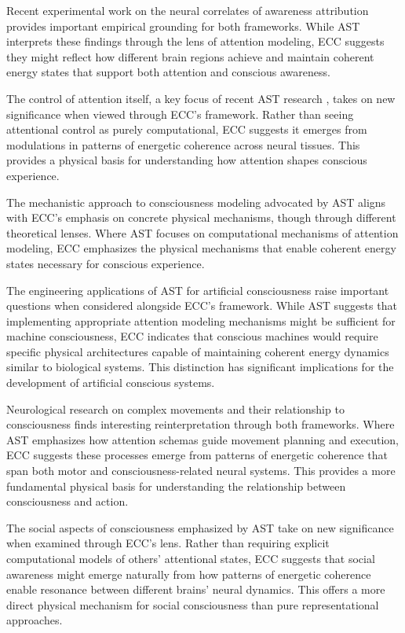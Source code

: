 Recent experimental work on the neural correlates of awareness attribution \cite{Webb2016} provides important empirical grounding for both frameworks. While AST interprets these findings through the lens of attention modeling, ECC suggests they might reflect how different brain regions achieve and maintain coherent energy states that support both attention and conscious awareness.

The control of attention itself, a key focus of recent AST research \cite{WebbKemper2020}, takes on new significance when viewed through ECC's framework. Rather than seeing attentional control as purely computational, ECC suggests it emerges from modulations in patterns of energetic coherence across neural tissues. This provides a physical basis for understanding how attention shapes conscious experience.

The mechanistic approach to consciousness modeling advocated by AST \cite{Kelly2016} aligns with ECC's emphasis on concrete physical mechanisms, though through different theoretical lenses. Where AST focuses on computational mechanisms of attention modeling, ECC emphasizes the physical mechanisms that enable coherent energy states necessary for conscious experience.

The engineering applications of AST for artificial consciousness \cite{Graziano2017} raise important questions when considered alongside ECC's framework. While AST suggests that implementing appropriate attention modeling mechanisms might be sufficient for machine consciousness, ECC indicates that conscious machines would require specific physical architectures capable of maintaining coherent energy dynamics similar to biological systems. This distinction has significant implications for the development of artificial conscious systems.

Neurological research on complex movements and their relationship to consciousness \cite{Graziano2002} finds interesting reinterpretation through both frameworks. Where AST emphasizes how attention schemas guide movement planning and execution, ECC suggests these processes emerge from patterns of energetic coherence that span both motor and consciousness-related neural systems. This provides a more fundamental physical basis for understanding the relationship between consciousness and action.

The social aspects of consciousness emphasized by AST \cite{Kelly2014} take on new significance when examined through ECC's lens. Rather than requiring explicit computational models of others' attentional states, ECC suggests that social awareness might emerge naturally from how patterns of energetic coherence enable resonance between different brains' neural dynamics. This offers a more direct physical mechanism for social consciousness than pure representational approaches.

